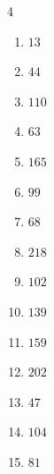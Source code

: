 \begin{multicols}{4}
\begin{enumerate}

\columnbreak %

\resetques

  \item $13$


  \item $44$


  \item $110$


  \item $63$


  \item $165$


  \item $99$


  \item $68$


  \item $218$


  \item $102$


  \item $139$


  \item $159$


  \item $202$


  \item $47$


  \item $104$


  \item $81$


\end{enumerate}
\end{multicols}
